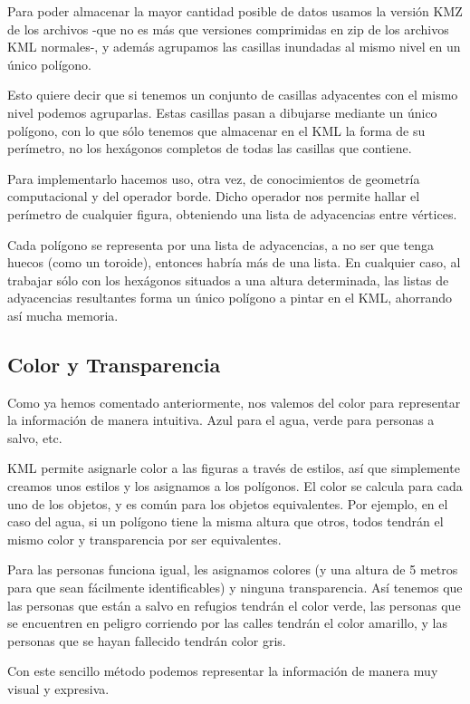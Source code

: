 Para poder almacenar la mayor cantidad posible de datos usamos la versión KMZ
de los archivos -que no es más que versiones comprimidas en zip de los
archivos KML normales-, y además agrupamos las casillas inundadas al mismo
nivel en un único polígono.

Esto quiere decir que si tenemos un conjunto de casillas adyacentes con el
mismo nivel podemos agruparlas. Estas casillas pasan a dibujarse mediante un
único polígono, con lo que sólo tenemos que almacenar en el KML la forma de su
perímetro, no los hexágonos completos de todas las casillas que contiene.

Para implementarlo hacemos uso, otra vez, de conocimientos de geometría
computacional y del operador borde. Dicho operador nos permite hallar el
perímetro de cualquier figura, obteniendo una lista de adyacencias entre
vértices.

Cada polígono se representa por una lista de adyacencias, a no ser que tenga
huecos (como un toroide), entonces habría más de una lista. En cualquier caso,
al trabajar sólo con los hexágonos situados a una altura determinada, las
listas de adyacencias resultantes forma un único polígono a pintar en el KML,
ahorrando así mucha memoria.

\subsection{Color y Transparencia}

Como ya hemos comentado anteriormente, nos valemos del color para representar
la información de manera intuitiva. Azul para el agua, verde para personas a
salvo, etc.

KML permite asignarle color a las figuras a través de estilos, así que
simplemente creamos unos estilos y los asignamos a los polígonos. El color se
calcula para cada uno de los objetos, y es común para los objetos equivalentes.
Por ejemplo, en el caso del agua, si un polígono tiene la misma altura que
otros, todos tendrán el mismo color y transparencia por ser equivalentes.

Para las personas funciona igual, les asignamos colores (y una altura de 5
metros para que sean fácilmente identificables) y ninguna transparencia. Así
tenemos que las personas que están a salvo en refugios tendrán el color verde,
las personas que se encuentren en peligro corriendo por las calles tendrán el
color amarillo, y las personas que se hayan fallecido tendrán color gris.

Con este sencillo método podemos representar la información de manera muy
visual y expresiva.

